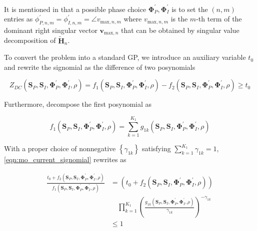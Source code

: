 It is mentioned in \cite{Clerckx2016} that a possible phase choice ${\mathbf{\Phi }}_P^\prime ,{\mathbf{\Phi }}_I^\prime $ is to set the $\left( {n,m} \right)$ entries as $\phi _{P,n,m}^\prime  = \phi _{I,n,m}^\prime  = \angle {v_{{\text{max}},n,m}}$ where ${v_{{\text{max}},n,m}}$ is the $m$-th term of the dominant right singular vector ${{\mathbf{v}}_{{\text{max}},n}}$ that can be obtained by singular value decomposition of ${\widetilde {\mathbf{H}}_n}$.

To convert the problem into a standard GP, we introduce an auxiliary variable ${t_0}$ and rewrite the signomial as the difference of two posynomials

\begin{equation}\label{eqn:mo_current_signomial}
  {Z_{DC}}\left( {{{\mathbf{S}}_P},{{\mathbf{S}}_I},{\mathbf{\Phi }}_P^\prime ,{\mathbf{\Phi }}_I^\prime ,\rho } \right) = {f_1}\left( {{{\mathbf{S}}_P},{{\mathbf{S}}_I},{\mathbf{\Phi }}_P^\prime ,{\mathbf{\Phi }}_I^\prime ,\rho } \right) - {f_2}\left( {{{\mathbf{S}}_P},{{\mathbf{S}}_I},{\mathbf{\Phi }}_P^\prime ,{\mathbf{\Phi }}_I^\prime ,\rho } \right) \geqslant {t_0}
\end{equation}

Furthermore, decompose the first posynomial as

\begin{equation}\label{eqn:mo_current_posynomial}
  {f_1}\left( {{{\mathbf{S}}_P},{{\mathbf{S}}_I},{\mathbf{\Phi }}_P^\prime ,{\mathbf{\Phi }}_I^\prime ,\rho } \right) = \sum\limits_{k = 1}^{{K_1}} {{g_{1k}}} \left( {{{\mathbf{S}}_P},{{\mathbf{S}}_I},{\mathbf{\Phi }}_P^\prime ,{\mathbf{\Phi }}_I^\prime ,\rho } \right)
\end{equation}

With a proper choice of nonnegative $\left\{ {{\gamma _{1k}}} \right\}$ satisfying $\sum\nolimits_{k = 1}^{{K_1}} {{\gamma _{1k}}}  = 1$, \eqref{eqn:mo_current_signomial} rewrites as

\begin{align}\label{eqn:mo_current_signomial_rewritten}
  \frac{{{t_0} + {f_2}\left( {{{\mathbf{S}}_P},{{\mathbf{S}}_I},{\mathbf{\Phi }}_P^\prime ,{\mathbf{\Phi }}_I^\prime ,\rho } \right)}}{{{f_1}\left( {{{\mathbf{S}}_P},{{\mathbf{S}}_I},{\mathbf{\Phi }}_P^\prime ,{\mathbf{\Phi }}_I^\prime ,\rho } \right)}} &= \left( {{t_0} + {f_2}\left( {{{\mathbf{S}}_P},{{\mathbf{S}}_I},{\mathbf{\Phi }}_P^\prime ,{\mathbf{\Phi }}_I^\prime ,\rho } \right)} \right) \nonumber \\
  &\quad \prod\limits_{k = 1}^{{K_1}} {{{\left( {\frac{{{g_{1k}}\left( {{{\mathbf{S}}_P},{{\mathbf{S}}_I},{\mathbf{\Phi }}_P^\prime ,{\mathbf{\Phi }}_I^\prime ,\rho } \right)}}{{{\gamma _{1k}}}}} \right)}^{ - {\gamma _{1k}}}}} \nonumber \\
  &\leqslant 1
\end{align}

